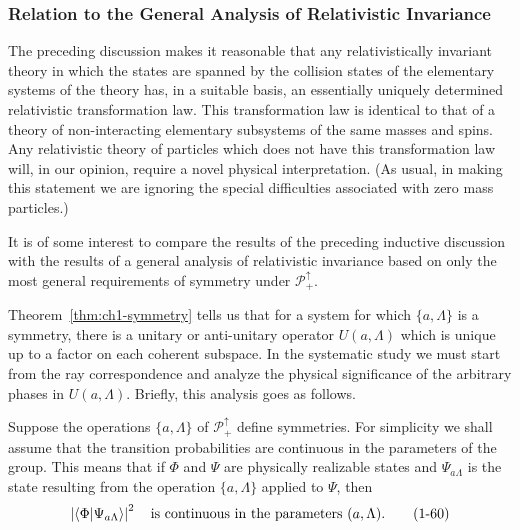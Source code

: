 \subsubsection{Relation to the General Analysis of Relativistic Invariance\protect\footnotemark}\label{sec:1.4-general-analysis}

The preceding discussion makes it reasonable that any relativistically invariant
theory in which the states are spanned by the collision states of the elementary
systems of the theory has, in a suitable basis, an essentially uniquely
determined relativistic transformation law. This transformation law is identical
to that of a theory of non-interacting elementary subsystems of the same masses
and spins. Any relativistic theory of particles which does not have this
transformation law will, in our opinion, require a novel physical
interpretation. (As usual, in making this statement we are ignoring the special
difficulties associated with zero mass particles.)

It is of some interest to compare the results of the preceding inductive
discussion with the results of a general analysis of relativistic invariance
based on only the most general requirements of symmetry under
$\mathcal{P}^{\uparrow}_{+}$.

Theorem~\ref{thm:ch1-symmetry} tells us that for a system for which $\{a,\Lambda\}$ is a symmetry,
there is a unitary or anti-unitary operator $U(a,\Lambda)$ which is unique up to
a factor on each coherent subspace. In the systematic study we must start from
the ray correspondence and analyze the physical significance of the arbitrary
phases in $U(a,\Lambda)$. Briefly, this analysis goes as follows.

Suppose the operations $\{a,\Lambda\}$ of $\mathcal{P}^{\uparrow}_{+}$ define
symmetries. For simplicity we shall assume that the transition probabilities
are continuous in the parameters of the group. This means that if $\Phi$ and
$\Psi$ are physically realizable states and $\Psi_{a\Lambda}$ is the state
resulting from the operation $\{a,\Lambda\}$ applied to $\Psi$, then
\begin{equation}
  \left|\langle \Phi\vert \Psi_{a\Lambda}\rangle\right|^2
  \quad\text{is continuous in the parameters }(a,\Lambda).
  \tag{1-60}\label{eq:1-60}
\end{equation}

